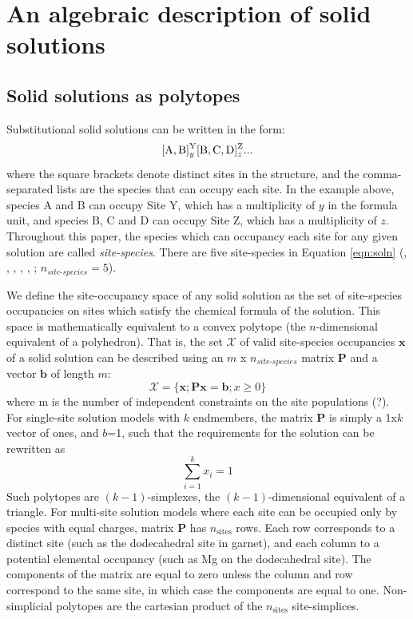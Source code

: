\documentclass[preprint,12pt]{elsarticle}
\begin{document}
\section{An algebraic description of solid solutions}
\subsection{Solid solutions as polytopes}
\label{sec:polytope_description}
Substitutional solid solutions can be written in the form:
\begin{equation}
    \ce{[A, B]^Y_y[B, C, D]^Z_z}...
    \label{eqn:soln}
\end{equation}
where the square brackets denote distinct sites in the structure, and the comma-separated lists are the species that can occupy each site. In the example above, species A and B can occupy Site Y, which has a multiplicity of $y$ in the formula unit, and species B, C and D can occupy Site Z, which has a multiplicity of $z$. Throughout this paper, the species which can occupancy each site for any given solution are called \emph{site-species}. There are five site-species in Equation \ref{eqn:soln} (, , , , , ; $n_{\textit{site-species}} = 5$).

We define the site-occupancy space of any solid solution as the set of site-species occupancies on sites which satisfy the chemical formula of the solution. This space is mathematically equivalent to a convex polytope (the $n$-dimensional equivalent of a polyhedron). That is, the set $\mathcal{X}$ of valid site-species occupancies $\boldsymbol{x}$ of a solid solution can be described using an $m$ x $n_{\textit{site-species}}$ matrix $\boldsymbol{P}$ and a vector $\boldsymbol{b}$ of length $m$:
\begin{equation}
  \mathcal{X} = \{\boldsymbol{x}; \boldsymbol{P}\boldsymbol{x} = \boldsymbol{b}; x \ge 0 \}
  \label{eqn:polytope_set}
\end{equation}
where m is the number of independent constraints on the site populations (?).
For single-site solution models with $k$ endmembers, the matrix $\boldsymbol{P}$ is simply a 1x$k$ vector of ones, and $b$=1, such that the requirements for the solution can be rewritten as
\begin{equation}
  \sum_{i=1}^{k} x_i = 1
\end{equation}
Such polytopes are $(k-1)$-simplexes, the $(k-1)$-dimensional equivalent of a triangle. For multi-site solution models where each site can be occupied only by species with equal charges, matrix $\boldsymbol{P}$ has $n_{\textrm{sites}}$ rows. Each row corresponds to a distinct site (such as the dodecahedral site in garnet), and each column to a potential elemental occupancy (such as Mg on the dodecahedral site). The components of the matrix are equal to zero unless the column and row correspond to the same site, in which case the components are equal to one. Non-simplicial polytopes are the cartesian product of the $n_{\textrm{sites}}$ site-simplices.
\end{document}

